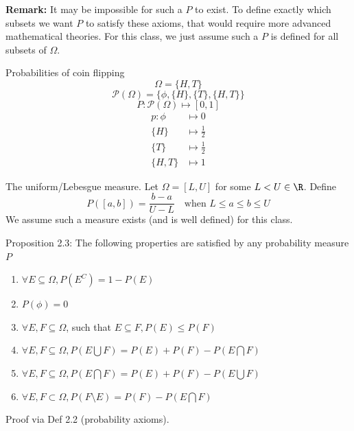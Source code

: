 
\textbf{Remark:} It may be impossible for such a $P$ to exist. To define exactly which subsets we want $P$ to satisfy these axioms, that would require more advanced mathematical theories. For this class, we just assume such a $P$ is defined for all subsets of $\Omega$.

\begin{example}
    Probabilities of coin flipping
    \[\Omega = \{H, T\}\]
    \[\mathcal{P}(\Omega) = \{\phi, \{H\}, \{T\}, \{H, T\}\}\]
    \[P: \mathcal{P}(\Omega) \mapsto [0, 1]\]
    \begin{align*}
        p: \phi &\mapsto 0 \\
        \{H\} &\mapsto \frac{1}{2} \\
        \{T\} &\mapsto \frac{1}{2} \\
        \{H, T\} &\mapsto 1
    \end{align*}
\end{example}

\begin{example}
    The uniform/Lebesgue measure.
    Let $\Omega =[L,U]$ for some $L < U \in \R$. Define
    \[P([a,b]) = \frac{b-a}{U-L} \quad \text{when } L \leq a \leq b \leq U\]
    We assume such a measure exists (and is well defined) for this class.
\end{example}

Proposition 2.3:
The following properties are satisfied by any probability measure $P$
\begin{enumerate}
    \item $\forall E \subseteq \Omega, P(E^C) = 1 - P(E)$
    \item $P(\phi) = 0$
    \item $\forall E, F \subseteq \Omega$, such that $E \subseteq F, P(E) \leq P(F)$ 
    \item $\forall E, F \subseteq \Omega, P(E\bigcup F) = P(E)+P(F) - P(E\bigcap F)$
    \item $\forall E, F \subseteq \Omega, P(E\bigcap F) = P(E)+P(F)-P(E\bigcup F)$
    \item $\forall E, F \subset \Omega, P(F \setminus E) = P(F) - P(E\bigcap F)$
\end{enumerate}

Proof via Def 2.2 (probability axioms).

